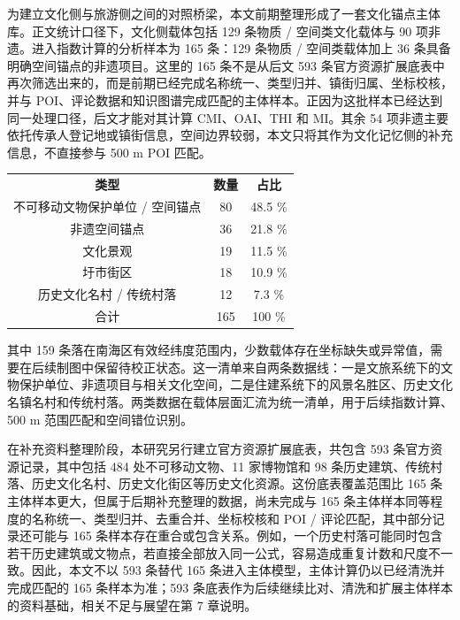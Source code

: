 为建立文化侧与旅游侧之间的对照桥梁，本文前期整理形成了一套文化锚点主体库。正文统计口径下，文化侧载体包括 129 条物质 / 空间类文化载体与 90 项非遗。进入指数计算的分析样本为 165 条：129 条物质 / 空间类载体加上 36 条具备明确空间锚点的非遗项目。这里的 165 条不是从后文 593 条官方资源扩展底表中再次筛选出来的，而是前期已经完成名称统一、类型归并、镇街归属、坐标校核，并与 POI、评论数据和知识图谱完成匹配的主体样本。正因为这批样本已经达到同一处理口径，后文才能对其计算 CMI、OAI、THI 和 MI。其余 54 项非遗主要依托传承人登记地或镇街信息，空间边界较弱，本文只将其作为文化记忆侧的补充信息，不直接参与 500 m POI 匹配。


{\def\LTcaptype{none} %
\begin{longtable}[]{@{}ccc@{}}
\toprule\noalign{}
\endhead
\bottomrule\noalign{}
\endlastfoot
\textbf{类型} & \textbf{数量} & \textbf{占比} \\
不可移动文物保护单位 / 空间锚点 & 80 & 48.5 \% \\
非遗空间锚点 & 36 & 21.8 \% \\
文化景观 & 19 & 11.5 \% \\
圩市街区 & 18 & 10.9 \% \\
历史文化名村 / 传统村落 & 12 & 7.3 \% \\
合计 & 165 & 100 \% \\
\end{longtable}
}

其中 159 条落在南海区有效经纬度范围内，少数载体存在坐标缺失或异常值，需要在后续制图中保留待校正状态。这一清单来自两条数据线：一是文旅系统下的文物保护单位、非遗项目与相关文化空间，二是住建系统下的风景名胜区、历史文化名镇名村和传统村落。两类数据在载体层面汇流为统一清单，用于后续指数计算、500 m 范围匹配和空间错位识别。

在补充资料整理阶段，本研究另行建立官方资源扩展底表，共包含 593 条官方资源记录，其中包括 484 处不可移动文物、11 家博物馆和 98 条历史建筑、传统村落、历史文化名村、历史文化街区等历史文化资源。这份底表覆盖范围比 165 条主体样本更大，但属于后期补充整理的数据，尚未完成与 165 条主体样本同等程度的名称统一、类型归并、去重合并、坐标校核和 POI / 评论匹配，其中部分记录还可能与 165 条样本存在重合或包含关系。例如，一个历史村落可能同时包含若干历史建筑或文物点，若直接全部放入同一公式，容易造成重复计数和尺度不一致。因此，本文不以 593 条替代 165 条进入主体模型，主体计算仍以已经清洗并完成匹配的 165 条样本为准；593 条底表作为后续继续比对、清洗和扩展主体样本的资料基础，相关不足与展望在第 7 章说明。

